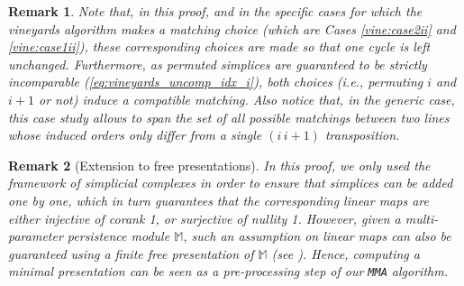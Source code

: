 \documentclass{article}
\newcommand{\Mbb}{\mathbb{M}}
\newcommand{\MMA}{\texttt{MMA}}
\newtheorem{remark}{Remark}%
\begin{document}
\begin{remark}
	Note that, in this proof, and in the specific cases for which the vineyards
	algorithm makes a matching choice (which are Cases \ref{vine:case2ii} and \ref{vine:case1ii}), these corresponding choices are made so that one cycle is left unchanged.
	Furthermore, as permuted simplices are guaranteed to be strictly incomparable
	(\cref{eq:vineyards_uncomp_idx_i}),
	both choices (i.e., permuting $i$ and $i+1$ or not) induce a compatible
	matching.
	Also notice that, in the generic case, this case study allows to span the set of all
	possible matchings between two lines whose induced orders only differ from a single $(i\, i+1)$ transposition. \\
\end{remark}

\begin{remark}[Extension to free presentations]\label{rem:free_pres}
	In this proof, we only used the framework of simplicial complexes
	in order to ensure that
	simplices can be added one by one, which in turn guarantees that the
	corresponding linear maps are
	either injective of corank 1, or surjective of nullity 1.
	However, given a multi-parameter persistence module $\Mbb$, such an assumption
	on linear maps can also be guaranteed
	using a finite free presentation of $\Mbb$ (see
	\cite[Section 7]{botnanIntroductionMultiparameterPersistence2023}).
	Hence, computing a minimal presentation can be seen as a pre-processing step
	of our \MMA{} algorithm. \\
\end{remark}
\end{document}
